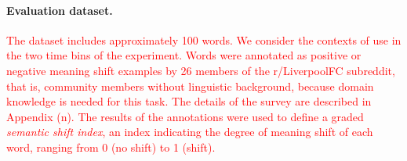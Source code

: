 \paragraph{Evaluation dataset.} 
\textcolor{red}{
The dataset includes approximately 100 words. We consider the contexts
of use in the two time bins of the experiment. Words were annotated as
positive or negative meaning shift examples by 26 members of the
r/LiverpoolFC subreddit, that is, community members without linguistic
background, because domain knowledge is needed for this task.
The details of the survey are described in Appendix (n). The results of the annotations were used to define a graded \emph{semantic shift index}, an index indicating the degree of meaning shift of each word, ranging from 0 (no shift) to 1 (shift).}


